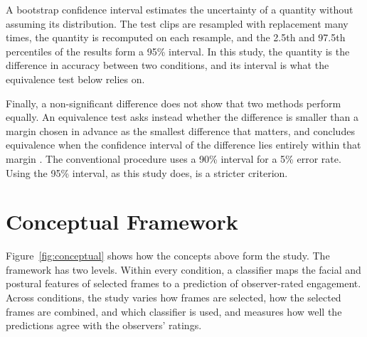 A bootstrap confidence interval \cite{efron1993} estimates the uncertainty of a quantity without assuming its distribution. The test clips are resampled with replacement many times, the quantity is recomputed on each resample, and the 2.5th and 97.5th percentiles of the results form a 95\% interval. In this study, the quantity is the difference in accuracy between two conditions, and its interval is what the equivalence test below relies on.

Finally, a non-significant difference does not show that two methods perform equally. An equivalence test asks instead whether the difference is smaller than a margin chosen in advance as the smallest difference that matters, and concludes equivalence when the confidence interval of the difference lies entirely within that margin \cite{lakens2017}. The conventional procedure uses a 90\% interval for a 5\% error rate. Using the 95\% interval, as this study does, is a stricter criterion.



\section{Conceptual Framework}
\label{sec:conceptual}

Figure~\ref{fig:conceptual} shows how the concepts above form the study. The framework has two levels. Within every condition, a classifier maps the facial and postural features of selected frames to a prediction of observer-rated engagement. Across conditions, the study varies how frames are selected, how the selected frames are combined, and which classifier is used, and measures how well the predictions agree with the observers' ratings.

